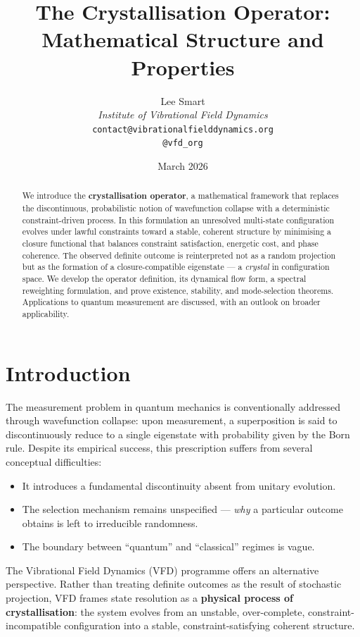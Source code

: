 \documentclass[12pt]{article}
\title{The Crystallisation Operator: Mathematical Structure and Properties}
\author{%
  Lee Smart\\[4pt]
  \textit{Institute of Vibrational Field Dynamics}\\[2pt]
  \texttt{contact@vibrationalfielddynamics.org}\\[2pt]
  \texttt{@vfd\_org}%
}
\date{March 2026}
\begin{document}
\maketitle

\begin{abstract}
We introduce the \textbf{crystallisation operator}, a mathematical framework that replaces the discontinuous, probabilistic notion of wavefunction collapse with a deterministic constraint-driven process. In this formulation an unresolved multi-state configuration evolves under lawful constraints toward a stable, coherent structure by minimising a closure functional that balances constraint satisfaction, energetic cost, and phase coherence. The observed definite outcome is reinterpreted not as a random projection but as the formation of a closure-compatible eigenstate --- a \textit{crystal} in configuration space. We develop the operator definition, its dynamical flow form, a spectral reweighting formulation, and prove existence, stability, and mode-selection theorems. Applications to quantum measurement are discussed, with an outlook on broader applicability.
\end{abstract}

\section{Introduction}

The measurement problem in quantum mechanics is conventionally addressed through wavefunction collapse: upon measurement, a superposition is said to discontinuously reduce to a single eigenstate with probability given by the Born rule. Despite its empirical success, this prescription suffers from several conceptual difficulties:
\begin{itemize}
    \item It introduces a fundamental discontinuity absent from unitary evolution.
    \item The selection mechanism remains unspecified --- \textit{why} a particular outcome obtains is left to irreducible randomness.
    \item The boundary between ``quantum'' and ``classical'' regimes is vague.
\end{itemize}

The Vibrational Field Dynamics (VFD) programme offers an alternative perspective. Rather than treating definite outcomes as the result of stochastic projection, VFD frames state resolution as a \textbf{physical process of crystallisation}: the system evolves from an unstable, over-complete, constraint-incompatible configuration into a stable, constraint-satisfying coherent structure.
\end{document}
